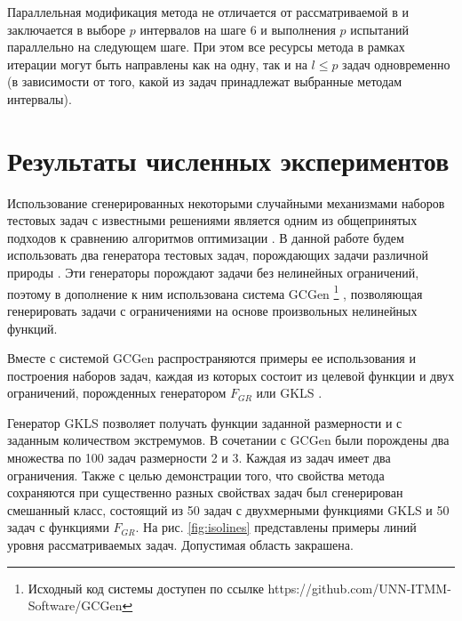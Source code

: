 \documentclass[11pt, oneside, a4paper]{article}
\begin{document}
Параллельная модификация метода не отличается от рассматриваемой в \cite{BarkalovStrongin2018}
и заключается в выборе \(p\) интервалов на шаге 6 и выполнения \(p\) испытаний параллельно
на следующем шаге. При этом все ресурсы метода в рамках итерации могут быть направлены как на одну, так и
на \(l\leqslant p\) задач одновременно (в зависимости от того, какой из задач принадлежат выбранные методам интервалы).

\section{Результаты численных экспериментов}

Использование сгенерированных некоторыми случайными механизмами
наборов тестовых задач с известными решениями является одним из общепринятых подходов
к сравнению алгоритмов оптимизации \cite{Beiranvand2017}. В данной работе
будем использовать два генератора тестовых задач, порождающих задачи различной природы \cite{grishaginClass, Gaviano2003}.
Эти генераторы порождают задачи без нелинейных ограничений, поэтому в дополнение к ним использована
система GCGen \footnote{Исходный код системы доступен по ссылке https://github.com/UNN-ITMM-Software/GCGen} \cite{GergelBarkalov2019}, позволяющая генерировать задачи с ограничениями на основе произвольных нелинейных
функций.

Вместе с системой GCGen распространяются примеры ее использования и построения
наборов задач, каждая из которых состоит из целевой функции и двух ограничений,
порожденных генератором \(F_{GR}\) \cite{grishaginClass} или GKLS \cite{Gaviano2003}.


Генератор GKLS \cite{Gaviano2003} позволяет получать функции заданной размерности и с заданным количеством экстремумов.
В сочетании с GCGen были порождены два множества по 100 задач размерности 2 и 3. Каждая из задач имеет два ограничения.
Также с целью демонстрации того, что свойства метода сохраняются при существенно разных свойствах задач
был сгенерирован смешанный класс, состоящий из 50 задач с двухмерными функциями GKLS и 50 задач с функциями \(F_{GR}\).
На рис. \ref{fig:isolines} представлены примеры линий уровня рассматриваемых задач. Допустимая область закрашена.
\end{document}
